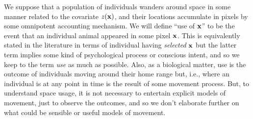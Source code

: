 We suppose that a population of individuals wanders around space in
some manner related to the covariate $z({\bf x})$, and their locations
accumulate in pixels by some omnipotent accounting mechanism. We will
define  ``use of ${\bf x}$'' to be the event that an individual animal appeared in
some pixel ${\bf x}$. This is equivalently stated in the literature in
terms of individual having {\it selected} ${\bf x}$ but the latter
term implies some kind of psychological process or conscious intent,
and so we keep to the term {\it use} as much as possible. 
Also, as a biological matter, use is the
outcome of individuals moving around their home range but, i.e., where
an individual is at any point in time is the result of some movement
process. But, to understand space usage, it is not necessary to
entertain explicit models of movement, just to observe the outcomes,
and so we don't elaborate further on what could be sensible or useful
models of movement. 


